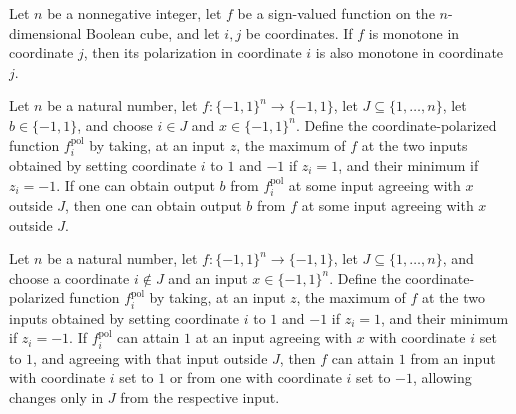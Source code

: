 \begin{theorem}
\label{FABL.isMonotoneInCoordinate_coordinatePolarization}
\leanok
{}
Let $n$ be a nonnegative integer, let $f$ be a sign-valued function on the
$n$-dimensional Boolean cube, and let $i,j$ be coordinates. If $f$ is monotone in
coordinate $j$, then its polarization in coordinate $i$ is also monotone in coordinate
$j$.
\end{theorem}

\begin{theorem}
\label{FABL.coalitionCanAttain_coordinatePolarization_imp_of_mem}
\leanok
{}
Let $n$ be a natural number, let $f\colon\{−1,1\}^n\to\{−1,1\}$, let
$J\subseteq\{1,\ldots,n\}$, let $b\in\{−1,1\}$, and choose $i\in J$ and
$x\in\{−1,1\}^n$. Define the coordinate-polarized function $f_i^{\mathrm{pol}}$ by
taking, at an input $z$, the maximum of $f$ at the two inputs obtained by setting
coordinate $i$ to $1$ and $-1$ if $z_i=1$, and their minimum if $z_i=-1$. If one can
obtain output $b$ from $f_i^{\mathrm{pol}}$ at some input agreeing with $x$ outside $J$,
then one can obtain output $b$ from $f$ at some input agreeing with $x$ outside $J$.
\end{theorem}

\begin{theorem}
\label{FABL.coalitionCanAttain_coordinatePolarization_one_set_one_imp}
\leanok
{}
Let $n$ be a natural number, let $f\colon\{−1,1\}^n\to\{−1,1\}$, let
$J\subseteq\{1,\ldots,n\}$, and choose a coordinate $i\notin J$ and an input
$x\in\{−1,1\}^n$. Define the coordinate-polarized function $f_i^{\mathrm{pol}}$ by
taking, at an input $z$, the maximum of $f$ at the two inputs obtained by setting
coordinate $i$ to $1$ and $-1$ if $z_i=1$, and their minimum if $z_i=-1$. If
$f_i^{\mathrm{pol}}$ can attain $1$ at an input agreeing with $x$ with coordinate $i$
set to $1$, and agreeing with that input outside $J$, then $f$ can attain $1$ from an
input with coordinate $i$ set to $1$ or from one with coordinate $i$ set to $-1$,
allowing changes only in $J$ from the respective input.
\end{theorem}

